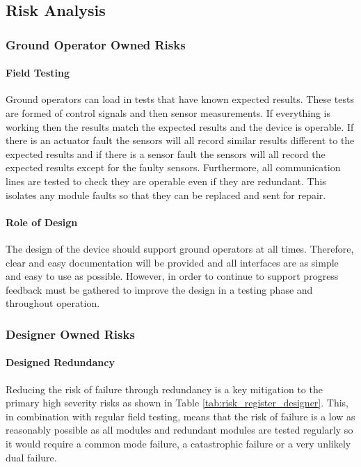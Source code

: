 \subsection{Risk Analysis}\label{sub_section:tgt_risk}
\subsubsection{Ground Operator Owned Risks}\label{sub_sub_section:tgt_ground_operator_risk}
 
\paragraph{Field Testing}
Ground operators can load in tests that have known expected results. These tests are formed of control signals and then sensor measurements. If everything is working then the results match the expected results and the device is operable. If there is an actuator fault the sensors will all record similar results different to the expected results and if there is a sensor fault the sensors will all record the expected results except for the faulty sensors. Furthermore, all communication lines are tested to check they are operable even if they are redundant. This isolates any module faults so that they can be replaced and sent for repair.
\paragraph{Role of Design}
The design of the device should support ground operators at all times. Therefore, clear and easy documentation will be provided and all interfaces are as simple and easy to use as possible. However, in order to continue to support progress feedback must be gathered to improve the design in a testing phase and throughout operation.

\subsubsection{Designer Owned Risks}\label{sub_sub_section:tgt_design_risk}
 
\paragraph{Designed Redundancy}
Reducing the risk of failure through redundancy is a key mitigation to the primary high severity risks as shown in Table \ref{tab:risk_register_designer}. This, in combination with regular field testing, means that the risk of failure is a low as reasonably possible as all modules and redundant modules are tested regularly so it would require a common mode failure, a catastrophic failure or a very unlikely dual failure.
